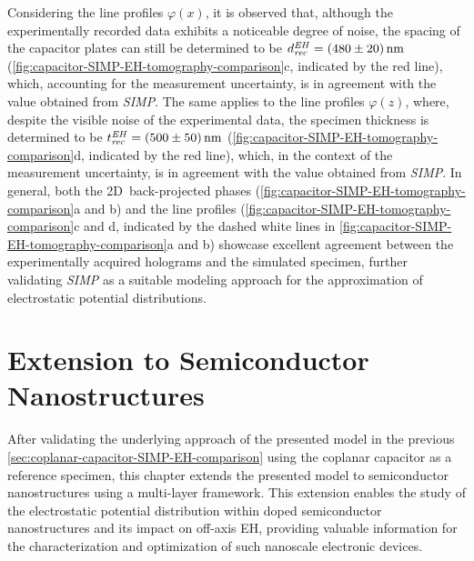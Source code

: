 Considering the line profiles $\varphi\left(x\right)$, it is observed that, although the experimentally recorded data exhibits a noticeable degree of noise, the spacing of the capacitor plates can still be determined to be $d_{\mathit{rec}}^{\mathit{EH}} = \SI{480 \pm 20}{\nm}$ (\cref{fig:capacitor-SIMP-EH-tomography-comparison}c, indicated by the red line), which, accounting for the measurement uncertainty, is in agreement with the value obtained from \emph{SIMP}. The same applies to the line profiles $\varphi\left(z\right)$, where, despite the visible noise of the experimental data, the specimen thickness is determined to be $t_{\mathit{rec}}^{\mathit{EH}} = \SI{500 \pm 50}{\nm}$ (\cref{fig:capacitor-SIMP-EH-tomography-comparison}d, indicated by the red line), which, in the context of the measurement uncertainty, is in agreement with the value obtained from \emph{SIMP}. In general, both the 2D~back-projected phases (\cref{fig:capacitor-SIMP-EH-tomography-comparison}a and b) and the line profiles (\cref{fig:capacitor-SIMP-EH-tomography-comparison}c and d, indicated by the dashed white lines in \cref{fig:capacitor-SIMP-EH-tomography-comparison}a and b) showcase excellent agreement between the experimentally acquired holograms and the simulated specimen, further validating \emph{SIMP} as a suitable modeling approach for the approximation of electrostatic potential distributions.
\newpage
\section{Extension to Semiconductor Nanostructures}
After validating the underlying approach of the presented model in the previous \cref{sec:coplanar-capacitor-SIMP-EH-comparison} using the coplanar capacitor as a reference specimen, this chapter extends the presented model to semiconductor nanostructures using a multi-layer framework. This extension enables the study of the electrostatic potential distribution within doped semiconductor nanostructures and its impact on off-axis EH, providing valuable information for the characterization and optimization of such nanoscale electronic devices.
